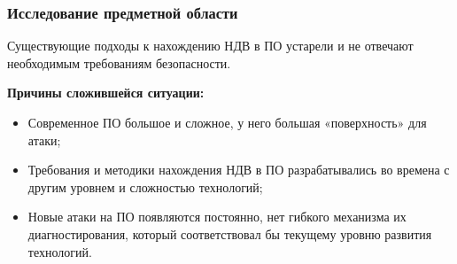 \begin{frame}%
\frametitle{Исследование предметной области}
    Существующие подходы к нахождению НДВ в ПО устарели и не отвечают необходимым требованиям безопасности.

    \textbf{Причины сложившейся ситуации:}
    \begin{itemize}
        \item Современное ПО большое и сложное, у него большая «поверхность» для атаки;
        \item Требования и методики нахождения НДВ в ПО разрабатывались во времена с другим уровнем и сложностью технологий;
        \item Новые атаки на ПО появляются постоянно, нет гибкого механизма их диагностирования, который соответствовал бы текущему уровню развития технологий.
    \end{itemize}
\end{frame}

